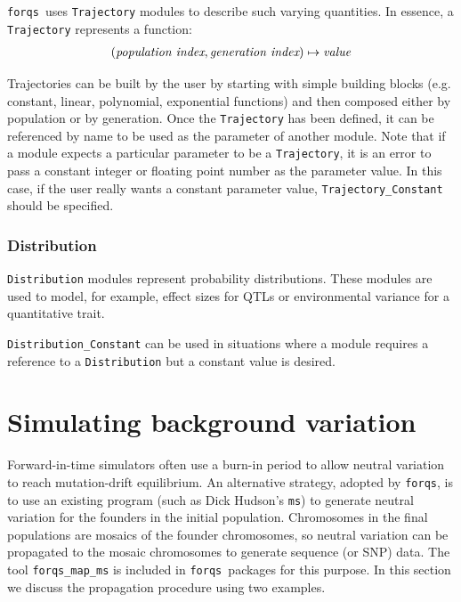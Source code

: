 \documentclass{article}
\newcommand{\forqs}[0]{\texttt{forqs }}
\begin{document}
\forqs uses \texttt{Trajectory} modules to describe such varying quantities.
In essence, a \texttt{Trajectory} represents a function:
\begin{align*}
    (\emph{population index}, \emph{generation index}) \mapsto \emph{value}
\end{align*}

Trajectories can be built by the user by starting with simple building
blocks (e.g. constant, linear, polynomial, exponential functions) and then
composed either by population or by generation.  Once the \texttt{Trajectory}
has been defined, it can be referenced by name to be used as the parameter of
another module.  Note that if a module expects a particular parameter to be a
\texttt{Trajectory}, it is an error to pass a constant integer or floating
point number as the parameter value.  In this case, if the user really wants a
constant parameter value, \texttt{Trajectory\_Constant} should be specified.


\subsubsection{Distribution}

\texttt{Distribution} modules represent probability distributions.
These modules are used to model, for example, effect sizes for QTLs or
environmental variance for a quantitative trait.

\texttt{Distribution\_Constant} can be used in situations where a module
requires a reference to a \texttt{Distribution} but a constant value is desired.


\newpage


\section{Simulating background variation}
\label{section_background_variation}

Forward-in-time simulators often use a burn-in period to allow neutral
variation to reach mutation-drift equilibrium.  An alternative strategy,
adopted by \texttt{forqs}, is to use an existing program (such as Dick Hudson's
\texttt{ms}) to generate neutral variation for the founders in the initial
population.  Chromosomes in the final populations are mosaics of the founder
chromosomes, so neutral variation can be propagated to the mosaic chromosomes to
generate sequence (or SNP) data.  The tool \texttt{forqs\_map\_ms} is included
in \forqs packages for this purpose.  In this section we discuss the propagation
procedure using two examples.  
\end{document}
